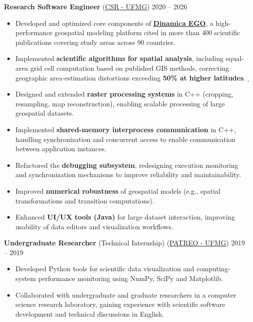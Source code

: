 \documentclass[10pt,a4paper]{article}
\begin{document}
\noindent\textbf{Research Software Engineer} (\href{https://csr.ufmg.br/}{CSR - UFMG}) \hfill 2020 -- 2026

\begin{itemize}
    \item Developed and optimized core components of \href{https://www.dinamicaego.com/}{\textbf{Dinamica EGO}}, a high-performance geospatial modeling platform cited in more than 400 scientific publications covering study areas across 90 countries.
    
    \item Implemented \textbf{scientific algorithms for spatial analysis}, including equal-area grid cell computation based on published GIS methods, correcting geographic area-estimation distortions exceeding \textbf{50\% at higher latitudes}. \href{https://ChrystianMelo.github.io/calcareas-asphaa.pdf}{\,\faExternalLink*}

    \item Designed and extended \textbf{raster processing systems} in C++ (cropping, resampling, map reconstruction), enabling scalable processing of large geospatial datasets.
    
    \item Implemented \textbf{shared-memory interprocess communication} in C++, handling synchronization and concurrent access to enable communication between application instances.
        
    \item Refactored the \textbf{debugging subsystem}, redesigning execution monitoring and synchronization mechanisms to improve reliability and maintainability.
        
    \item Improved \textbf{numerical robustness} of geospatial models (e.g., spatial transformations and transition computations).
        
    \item Enhanced \textbf{UI/UX tools (Java)} for large dataset interaction, improving usability of data editors and visualization workflows.
\end{itemize}

\noindent\textbf{Undergraduate Researcher} (Technical Internship) (\href{https://dcc.ufmg.br/pattern-recognition-and-earth-observation/}{PATREO - UFMG}) \hfill 2019 -- 2019
\begin{itemize}
    \item Developed Python tools for scientific data visualization and computing-system performance monitoring using NumPy, SciPy and Matplotlib.
    \item Collaborated with undergraduate and graduate researchers in a computer science research laboratory, gaining experience with scientific software development and technical discussions in English.
\end{itemize}
\end{document}

